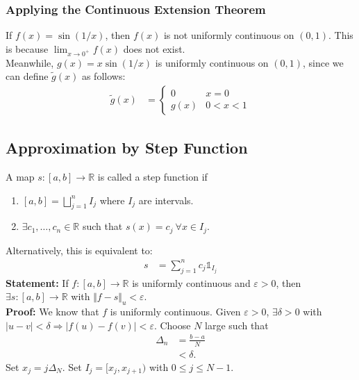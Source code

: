 \documentclass[10pt]{extarticle}
\newcommand{\R}{\mathbb{R}}
\begin{document}
    \subsubsection{Applying the Continuous Extension Theorem}%
    If $f(x) = \sin(1/x)$, then $f(x)$ is not uniformly continuous on $(0,1)$. This is because $\lim_{x\rightarrow 0^+}f(x)$ does not exist.\\

    Meanwhile, $g(x) = x\sin(1/x)$ is uniformly continuous on $(0,1)$, since we can define $\tilde{g}(x)$ as follows:
    \begin{align*}
      \tilde{g}(x) &= \begin{cases}
        0 & x=0\\
        g(x) & 0 < x < 1
      \end{cases}
    \end{align*}
  \subsection{Approximation by Step Function}%
    A map $s: [a,b] \rightarrow \R$ is called a step function if
    \begin{enumerate}[(1)]
      \item $\displaystyle [a,b] = \bigsqcup_{j=1}^{n} I_j$ where $I_j$ are intervals.
      \item $\displaystyle \exists c_1,\dots,c_n\in\R$ such that $s(x) = c_j~\forall x\in I_j$.
    \end{enumerate}
    Alternatively, this is equivalent to:
    \begin{align*}
      s &= \sum_{j=1}^{n}c_j\mathbb{1}_{I_j}
    \end{align*}
    \textbf{Statement:} If $f: [a,b]\rightarrow \R$ is uniformly continuous and $\varepsilon > 0$, then $\exists s: [a,b]\rightarrow \R$ with $\Vert f - s\Vert_u < \varepsilon$.\\

    \textbf{Proof:} We know that $f$ is uniformly continuous. Given $\varepsilon > 0$, $\exists \delta > 0$ with $|u-v| < \delta \Rightarrow |f(u) - f(v)| < \varepsilon$. Choose $N$ large such that
    \begin{align*}
      \Delta_{n} &= \frac{b-a}{N}\\
                 &< \delta.
    \end{align*}
    Set $x_j = j\Delta_{N}$. Set $I_j = [x_j,x_{j+1})$ with $0 \leq j \leq N-1$.\\
\end{document}
